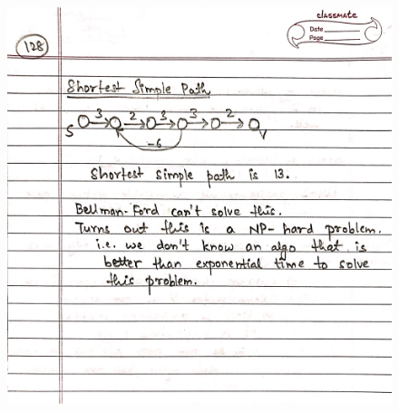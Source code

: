 \begin{figure}[H]
    \centering
    \includegraphics[width=16cm, height=21cm]{"./MIT-6.006/MIT-6006-128"}
\end{figure}
\newpage
